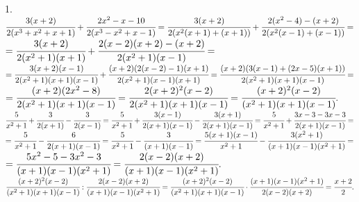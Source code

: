 1. $\cfrac{3(x+2)}{2(x^3+x^2+x+1)}+\cfrac{2x^2-x-10}{2(x^3-x^2+x-1)}=
\cfrac{3(x+2)}{2(x^2(x+1)+(x+1))}+\cfrac{2(x^2-4)-(x+2)}{2(x^2(x-1)+(x-1))}=$\\$=
\cfrac{3(x+2)}{2(x^2+1)(x+1)}+\cfrac{2(x-2)(x+2)-(x+2)}{2(x^2+1)(x-1)}=$\\$=
\cfrac{3(x+2)(x-1)}{2(x^2+1)(x+1)(x-1)}+\cfrac{(x+2)(2(x-2)-1)(x+1)}{2(x^2+1)(x-1)(x+1)}=
\cfrac{(x+2)(3(x-1)+(2x-5)(x+1))}{2(x^2+1)(x+1)(x-1)}=$\\$=\cfrac{(x+2)(2x^2-8)}{2(x^2+1)(x+1)(x-1)}=
\cfrac{2(x+2)^2(x-2)}{2(x^2+1)(x+1)(x-1)}=\cfrac{(x+2)^2(x-2)}{(x^2+1)(x+1)(x-1)}.$\\
$\cfrac{5}{x^2+1}+\cfrac{3}{2(x+1)}-\cfrac{3}{2(x-1)}=\cfrac{5}{x^2+1}+\cfrac{3(x-1)}{2(x+1)(x-1)}-\cfrac{3(x+1)}{2(x+1)(x-1)}=
\cfrac{5}{x^2+1}+\cfrac{3x-3-3x-3}{2(x+1)(x-1)}=$\\$=\cfrac{5}{x^2+1}-\cfrac{6}{2(x+1)(x-1)}=\cfrac{5}{x^2+1}-\cfrac{3}{(x+1)(x-1)}=
\cfrac{5(x+1)(x-1)}{x^2+1}-\cfrac{3(x^2+1)}{(x+1)(x-1)(x^2+1)}=$\\$=\cfrac{5x^2-5-3x^2-3}{(x+1)(x-1)(x^2+1)}=
\cfrac{2(x-2)(x+2)}{(x+1)(x-1)(x^2+1)}.
$\\
$\cfrac{(x+2)^2(x-2)}{(x^2+1)(x+1)(x-1)}:\cfrac{2(x-2)(x+2)}{(x+1)(x-1)(x^2+1)}=\cfrac{(x+2)^2(x-2)}{(x^2+1)(x+1)(x-1)}\cdot\cfrac{(x+1)(x-1)(x^2+1)}{2(x-2)(x+2)}=\cfrac{x+2}{2}.$\\
